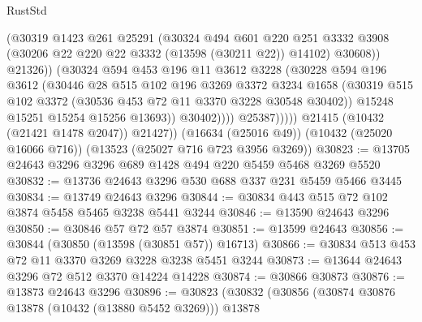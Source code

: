 \begin{lexlean}{RustStd}
\begin{coremodule}
                            (@30319
                              @1423
                              @261
                              @25291
                              (@30324
                                @494
                                @601
                                @220
                                @251
                                @3332
                                @3908
                                (@30206 @22 @220 @22 @3332 (@13598 (@30211 @22)) @14102)
                                @30608))
                            @21326))
                        (@30324
                          @594
                          @453
                          @196
                          @11
                          @3612
                          @3228
                          (@30228
                            @594
                            @196
                            @3612
                            (@30446
                              @28
                              @515
                              @102
                              @196
                              @3269
                              @3372
                              @3234
                              @1658
                              (@30319
                                @515
                                @102
                                @3372
                                (@30536 @453 @72 @11 @3370 @3228 @30548 @30402))
                              @15248
                              @15251
                              @15254
                              @15256
                              @13693))
                          @30402))))
                  @25387)))))
        @21415
        (@10432 (@21421 @1478 @2047))
        @21427))
    (@16634 (@25016 @49))
    (@10432 (@25020 @16066 @716))
    (@13523 (@25027 @716 @723 @3956 @3269))
@30823 := @13705 @24643 @3296 @3296 @689 @1428 @494 @220 @5459 @5468 @3269 @5520
@30832 := @13736 @24643 @3296 @530 @688 @337 @231 @5459 @5466 @3445
@30834 := @13749 @24643 @3296
@30844 := @30834 @443 @515 @72 @102 @3874 @5458 @5465 @3238 @5441 @3244
@30846 := @13590 @24643 @3296
@30850 := @30846 @57 @72 @57 @3874
@30851 := @13599 @24643
@30856 := @30844 (@30850 (@13598 (@30851 @57)) @16713)
@30866 := @30834 @513 @453 @72 @11 @3370 @3269 @3228 @3238 @5451 @3244
@30873 := @13644 @24643 @3296 @72 @512 @3370 @14224 @14228
@30874 := @30866 @30873
@30876 := @13873 @24643 @3296
@30896 := @30823
    (@30832
      (@30856
        (@30874 @30876 @13878 (@10432 (@13880 @5452 @3269)))
        @13878

\end{coremodule}
\end{lexlean}
